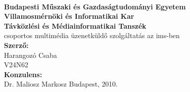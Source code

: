 
\begin{titlepage}
\begin{center}
 \\[20pt]
{\large \bf Budapesti Műszaki és Gazdaságtudományi Egyetem} \\
{\large \bf Villamosmérnöki és Informatikai Kar}\\
{\large \bf Távközlési és Médiainformatikai Tanszék}\\
\vfill {\Large \sc csoportos multimédia üzenetküldő szolgáltatás az ims-ben} \\[20pt]
\vfill
{\bf Szerző:}\\
{\large Harangozó Csaba \\
{\sc V24N62} \\}
\vfill
{\bf Konzulens:}\\
Dr. Maliosz Markosz
\vfill {\Large Budapest, 2010.}
\end{center}
\end{titlepage}
